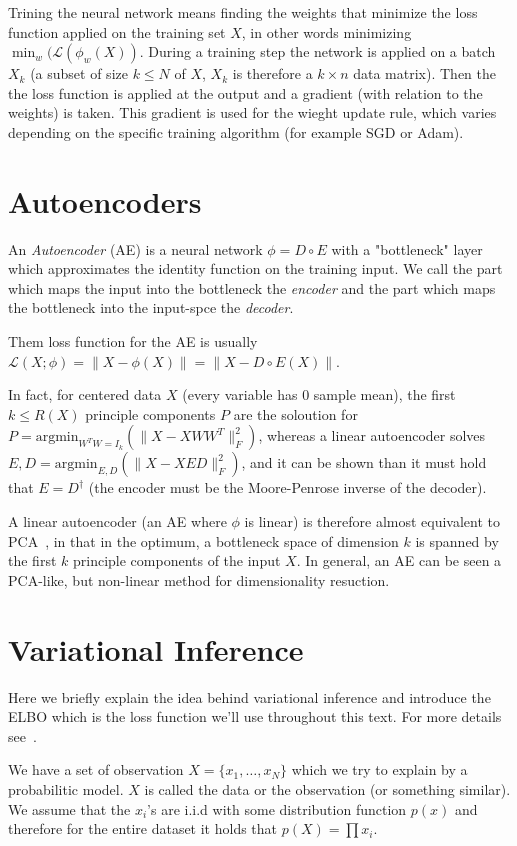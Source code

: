 \documentclass[11pt, a4paper]{report}
\theoremstyle{plain}
\theoremstyle{definition}
\theoremstyle{remark}
\begin{document}
Trining the neural network means finding the weights that minimize the loss function 
applied on the training set $X$, in other words minimizing 
$\min_{w} (\mathcal{L}(\phi_w(X))$.
During a training step the network is applied on a batch $X_k$ (a subset of size
$k \leq N$ of $X$, $X_k$ is therefore a $k\times n$ data matrix). 
Then the the loss function is applied at the output and a gradient
(with relation to the weights) is taken. This gradient is used for the wieght
update rule, which varies depending on the specific training algorithm (for
example SGD or Adam).



\section{Autoencoders}
An \textit{Autoencoder} (AE) is a neural network $\phi = D \circ E$ with a "bottleneck" layer which
approximates the identity function on the training input.
We call the part which maps the input into the bottleneck the \textit{encoder} and the
part which maps the bottleneck into the input-spce the \textit{decoder}.

Them loss function for the AE is usually 
$\mathcal{L}(X;\phi) = \|X - \phi(X)\| = \|X - D \circ E (X) \|$.

In fact, for centered data $X$ (every variable has $0$ sample mean), the first
$k \leq R(X)$ principle components $P$ are the soloution for 
$P = \text{argmin}_{W^T W = I_k} (\|X - XWW^T\|_F^2)$, whereas a linear autoencoder
solves $E,D = \text{argmin}_{E,D}(\|X - XED\|_F^2)$, and it can be shown than
it must hold that $E = D^{\dagger}$ (the encoder must be the Moore-Penrose
inverse of the decoder).

A linear autoencoder (an AE where $\phi$ is linear) is therefore almost equivalent to
PCA~\cite{plaut2018principal}, in that in the optimum, a bottleneck space of dimension $k$
is spanned by the first $k$ principle components of the input $X$.
In general, an AE can be seen a PCA-like, but non-linear method for
dimensionality resuction.

\section{Variational Inference}
Here we briefly explain the idea behind variational inference and introduce the
ELBO which is the loss function we'll use throughout this text.
For more details see~.

We have a set of observation $X = \{x_1, \dots , x_N\}$ which we try to explain
by a probabilitic model. 
$X$ is called the data or the observation (or something similar). We assume that
the $x_i$'s are i.i.d with some distribution function $p(x)$ and therefore for
the entire dataset it holds that $p(X) = \prod x_i$.
\end{document}
